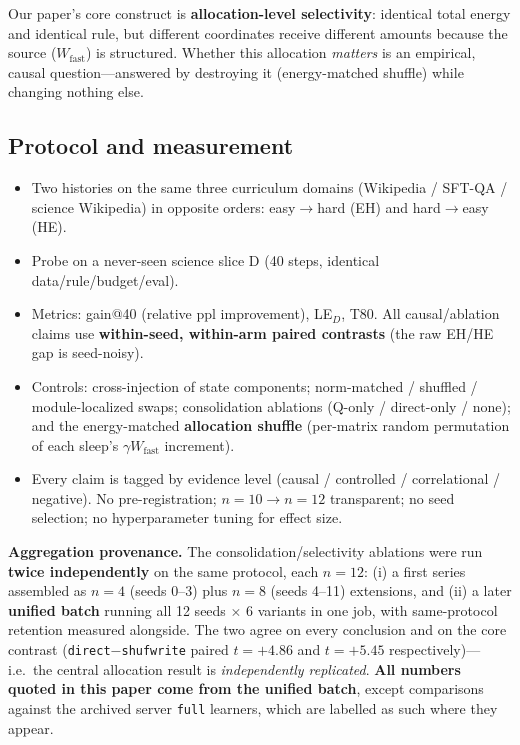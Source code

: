 \documentclass{article} %
\begin{document}
Our paper's core construct is \textbf{allocation-level selectivity}: identical total energy and identical rule, but different coordinates receive different amounts because the source ($W_{\mathrm{fast}}$) is structured. Whether this allocation \emph{matters} is an empirical, causal question---answered by destroying it (energy-matched shuffle) while changing nothing else.

\subsection{Protocol and measurement}
\label{sec:protocol}

\begin{itemize}
\item Two histories on the same three curriculum domains (Wikipedia / SFT-QA / science Wikipedia) in opposite orders: easy$\to$hard (EH) and hard$\to$easy (HE).
\item Probe on a never-seen science slice D (40 steps, identical data/rule/budget/eval).
\item Metrics: gain@40 (relative ppl improvement), LE$_D$, T80. All causal/ablation claims use \textbf{within-seed, within-arm paired contrasts} (the raw EH/HE gap is seed-noisy).
\item Controls: cross-injection of state components; norm-matched / shuffled / module-localized swaps; consolidation ablations (Q-only / direct-only / none); and the energy-matched \textbf{allocation shuffle} (per-matrix random permutation of each sleep's $\gamma W_{\mathrm{fast}}$ increment).
\item Every claim is tagged by evidence level (causal / controlled / correlational / negative). No pre-registration; $n{=}10\to n{=}12$ transparent; no seed selection; no hyperparameter tuning for effect size.
\end{itemize}

\textbf{Aggregation provenance.} The consolidation/selectivity ablations were run \textbf{twice independently} on the same protocol, each $n{=}12$: (i) a first series assembled as $n{=}4$ (seeds 0--3) plus $n{=}8$ (seeds 4--11) extensions, and (ii) a later \textbf{unified batch} running all 12 seeds $\times$ 6 variants in one job, with same-protocol retention measured alongside. The two agree on every conclusion and on the core contrast (\texttt{direct}$-$\texttt{shufwrite} paired $t{=}{+}4.86$ and $t{=}{+}5.45$ respectively)---i.e.\ the central allocation result is \emph{independently replicated}. \textbf{All numbers quoted in this paper come from the unified batch}, except comparisons against the archived server \texttt{full} learners, which are labelled as such where they appear.
\end{document}
